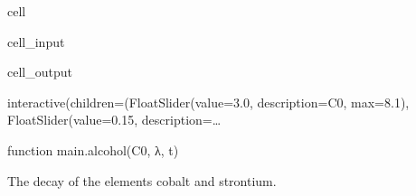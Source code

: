 \documentclass[letterpaper,10pt,english]{jupyterBook}
\begin{document}
\begin{sphinxuseclass}{cell}
\begin{sphinxVerbatimInput}
\begin{sphinxuseclass}{cell_input}
\end{sphinxuseclass}\end{sphinxVerbatimInput}
\begin{sphinxVerbatimOutput}

\begin{sphinxuseclass}{cell_output}
\begin{sphinxVerbatim}[commandchars=\\\{\}]
interactive(children=(FloatSlider(value=3.0, description=\PYGZsq{}C0\PYGZsq{}, max=8.1), FloatSlider(value=0.15, description=\PYGZsq{}…
\end{sphinxVerbatim}

\begin{sphinxVerbatim}[commandchars=\\\{\}]
\PYGZlt{}function \PYGZus{}\PYGZus{}main\PYGZus{}\PYGZus{}.alcohol(C0, λ, t)\PYGZgt{}
\end{sphinxVerbatim}

\end{sphinxuseclass}\end{sphinxVerbatimOutput}

\end{sphinxuseclass}
\sphinxAtStartPar
The decay of the elements cobalt and strontium.
\end{document}
